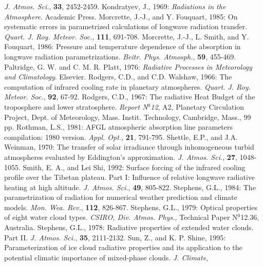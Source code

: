       {\it J. Atmos. Sci.},
      {\bf 33},
      2452-2459.
\decrefname
Kondratyev, J., 1969:
      {\it Radiations in the Atmosphere}.
      Academic Press.
\decrefname
Morcrette, J.-J., and Y. Fouquart, 1985:
      On systematic errors in parametrized calculations of longwave radiation
      transfer.
      {\it Quart. J. Roy. Meteor. Soc.},
      {\bf 111},
      691-708.
\decrefname
Morcrette, J.-J., L. Smith, and Y. Fouquart, 1986:
      Pressure and temperature dependence of the absorption in longwave
      radiation parametrizations.
      {\it Beitr. Phys. Atmosph.},
      {\bf 59},
      455-469.
\decrefname
Paltridge, G. W. and C. M. R. Platt, 1976:
      {\it Radiative Processes in Meteorology and Climatology}.
      Elsevier.
\decrefname
Rodgers, C.D., and C.D. Walshaw, 1966:
      The computation of infrared cooling rate in planetary atmospheres.
      {\it Quart. J. Roy. Meteor. Soc.},
      {\bf 92},
      67-92.
\decrefname
Rodgers, C.D., 1967:
      The radiative Heat Budget of the troposphere and lower stratosphere.
      {\it Report N$^0$12},
      A2, Planetary Circulation Project, Dept. of Meteorology, Mass. Instit.
      Technology, Cambridge, Mass.,
      99 pp.
\decrefname
Rothman, L.S., 1981:
      AFGL atmospheric absorption line parameters compilation: 1980 version.
      {\it Appl. Opt.},
      {\bf 21},
      791-795.
\decrefname
Shettle, E.P., and J.A. Weinman, 1970:
      The transfer of solar irradiance through inhomogeneous turbid atmospheres
      evaluated by Eddington's approximation.
      {\it J. Atmos. Sci.},
      {\bf 27},
      1048-1055.
\decrefname
Smith, E. A., and Lei Shi, 1992:
      Surface forcing of the infrared cooling profile over the Tibetan plateau.
      Part I: Influence of relative longwave radiative heating at high altitude.
      {\it J. Atmos. Sci.},
      {\bf 49},
      805-822.
\decrefname
Stephens, G.L., 1984:
      The parametrization of radiation for numerical weather prediction and
      climate models.
      {\it Mon. Wea. Rev.},
      {\bf 112},
      826-867.
\decrefname
Stephens, G.L., 1979:
      Optical properties of eight water cloud types.
      {\it CSIRO, Div. Atmos. Phys.},
      Technical Paper N$^0$12.36,
      Australia.
\decrefname
Stephens, G.L., 1978:
      Radiative properties of extended water clouds. Part II.
      {\it J. Atmos. Sci.},
      {\bf 35},
      2111-2132.
\decrefname
Sun, Z., and K. P. Shine, 1995:
      Parameterization of ice cloud radiative properties and its application to
      the potential climatic importance of mixed-phase clouds.
      {\it J. Climate},
